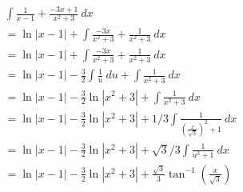 \documentclass{article}
\theoremstyle{mytheoremstyle}
\theoremstyle{mytheoremstyle}
\theoremstyle{myproblemstyle}
\begin{document}
    \begin{align*}
        \int \frac{1}{x-1} + \frac{-3x+1}{x^2+3} \ dx \\
        = \ln|x-1| + \int \frac{-3x}{x^2+3} + \frac{1}{x^2+3} \ dx \\
        = \ln|x-1| + \int \frac{-3x}{x^2+3} + \frac{1}{x^2+3} \ dx \\
        = \ln|x-1| - \frac{3}{2} \int \frac{1}{u} \ du + \int \frac{1}{x^2+3} \ dx \\
        = \ln|x-1| - \frac{3}{2} \ln|x^2+3| + \int \frac{1}{x^2+3} \ dx \\
        = \ln|x-1| - \frac{3}{2} \ln|x^2+3| + 1/3 \int \frac{1}{(\frac{x}{\sqrt{3}})^2+1} \ dx \\
        = \ln|x-1| - \frac{3}{2} \ln|x^2+3| + \sqrt{3}/3 \int \frac{1}{u^2+1} \ dx \\
        = \ln|x-1| - \frac{3}{2} \ln|x^2+3| + \frac{\sqrt{3}}{3} \tan^{-1}(\frac{x}{\sqrt{3}})
    \end{align*}
\end{document}
